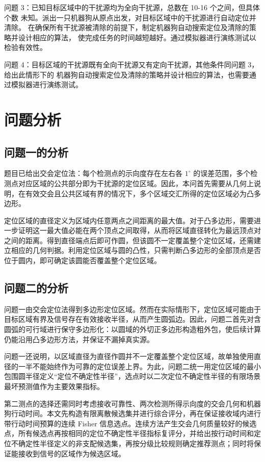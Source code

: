 \documentclass[withoutpreface,bwprint]{cumcmthesis}
\begin{document}
问题 3：已知目标区域中的干扰源均为全向干扰源，总数在 10-16 个之间，但具体个数
未知。派出一只机器狗从原点出发，对目标区域中的干扰源进行自动定位并清除。
在确保所有干扰源被清除的前提下，制定机器狗自动搜索定位及清除的策略并设计相应的算法，
使完成任务的时间越短越好。通过模拟器进行演练测试以检验有效性。

问题 4：目标区域的干扰源既有全向干扰源又有定向干扰源，其他条件同问题 3，给出此情形下的
机器狗自动搜索定位及清除的策略并设计相应的算法，也需要通过模拟器进行演练测试。

\section{问题分析}

\subsection{问题一的分析}

题目已给出交会定位法：每个检测点的示向度存在左右各 $1^\circ$ 的误差范围，多个检测点对应区域的公共部分即为干扰源的定位区域。因此，本问首先需要从几何上说明，在有效交会且公共区域有界的情况下，多个区域交汇所得的定位区域必为凸多边形。

定位区域的直径定义为区域内任意两点之间距离的最大值。对于凸多边形，需要进一步证明这一最大值必能在两个顶点之间取得，从而将区域直径转化为最远顶点对之间的距离。得到直径端点后即可作圆，但该圆不一定覆盖整个定位区域，还需建立相应的几何判据。利用定位区域与圆的凸性，只需判断凸多边形的全部顶点是否位于圆内，即可确定该圆能否覆盖整个定位区域。

\subsection{问题二的分析}

问题一由交会定位法得到多边形定位区域。然而在实际情形下，定位区域可能由于目标区域有界及信号存在有效接收半径，从而产生圆弧边。因此，问题二首先对含圆弧的可行域进行保守多边形化：以圆域的外切正多边形构造粗外包，使后续计算仍能沿用凸多边形方法，并保证不漏掉真实源。

问题一还说明，以区域直径为直径作圆并不一定覆盖整个定位区域，故单独使用直径的一半不能始终作为可靠的定位误差上界。为此，问题二统一用定位区域的最小包围圆半径定义“定位不确定性半径”，选点时以二次定位不确定性半径的有限场景最坏预测值作为主要效果指标。

第二测点的选择还需同时考虑接收可靠性、两次检测所得示向度的交会几何和机器狗行动时间。本文先构造有限离散候选集并进行综合评分，再在保证接收域内进行带行动时间预算的连续 Fisher 信息选点。连续方法产生交会几何质量较好的候选点，所有候选点再按相同的定位不确定性半径指标复评分，并给出按行动时间和定位不确定性半径定义的非支配候选集，再按分级比较规则确定推荐测点；同时将保证能接收到信号的区域作为候选区域。
\end{document}
